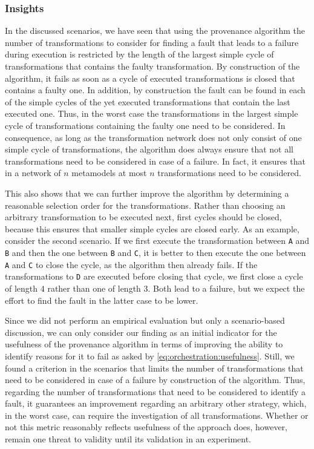 \subsubsection{Insights}

In the discussed scenarios, we have seen that using the provenance algorithm the number of transformations to consider for finding a fault that leads to a failure during execution is restricted by the length of the largest simple cycle of transformations that contains the faulty transformation.
By construction of the algorithm, it fails as soon as a cycle of executed transformations is closed that contains a faulty one.
In addition, by construction the fault can be found in each of the simple cycles of the yet executed transformations that contain the last executed one.
Thus, in the worst case the transformations in the largest simple cycle of transformations containing the faulty one need to be considered.
In consequence, as long as the transformation network does not only consist of one simple cycle of transformations, the algorithm does always ensure that not all transformations need to be considered in case of a failure.
In fact, it ensures that in a network of $n$ metamodels at most $n$ transformations need to be considered.

This also shows that we can further improve the algorithm by determining a reasonable selection order for the transformations.
Rather than choosing an arbitrary transformation to be executed next, first cycles should be closed, because this ensures that smaller simple cycles are closed early.
As an example, consider the second scenario.
If we first execute the transformation between \texttt{A} and \texttt{B} and then the one between \texttt{B} and \texttt{C}, it is better to then execute the one between \texttt{A} and \texttt{C} to close the cycle, as the algorithm then already fails.
If the transformations to \texttt{D} are executed before closing that cycle, we first close a cycle of length $4$ rather than one of length $3$. Both lead to a failure, but we expect the effort to find the fault in the latter case to be lower.

Since we did not perform an empirical evaluation but only a scenario-based discussion, we can only consider our finding as an initial indicator for the usefulness of the provenance algorithm in terms of improving the ability to identify reasons for it to fail as asked by \autoref{eq:orchestration:usefulness}.
Still, we found a criterion in the scenarios that limits the number of transformations that need to be considered in case of a failure by construction of the algorithm.
Thus, regarding the number of transformations that need to be considered to identify a fault, it guarantees an improvement regarding an arbitrary other strategy, which, in the worst case, can require the investigation of all transformations.
Whether or not this metric reasonably reflects usefulness of the approach does, however, remain one threat to validity until its validation in an experiment.

